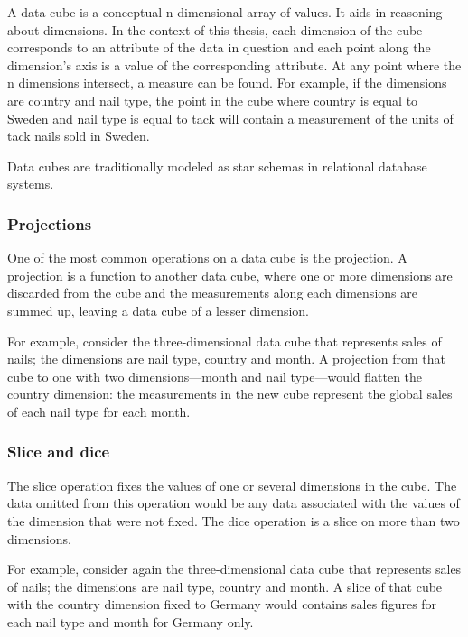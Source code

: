A data cube is a conceptual n-dimensional array of values. It aids in
reasoning about dimensions. In the context of this thesis, each dimension of
the cube corresponds to an attribute of the data in question and each point
along the dimension's axis is a value of the corresponding attribute. At any
point where the n dimensions intersect, a measure can be found. For example,
if the dimensions are country and nail type, the point in the cube where
country is equal to Sweden and nail type is equal to tack will contain a
measurement of the units of tack nails sold in Sweden.

Data cubes are traditionally modeled as star schemas in relational database
systems. \cite{olap_solutions}


\subsubsection*{Projections}

One of the most common operations on a data cube is the projection. A
projection is a function to another data cube, where one or more dimensions
are discarded from the cube and the measurements along each dimensions are
summed up, leaving a data cube of a lesser dimension.

For example, consider the three-dimensional data cube that represents sales of
nails; the dimensions are nail type, country and month. A projection from that
cube to one with two dimensions---month and nail type---would flatten the
country dimension: the measurements in the new cube represent the global sales
of each nail type for each month.


\subsubsection*{Slice and dice}


The slice operation fixes the values of one or several dimensions in the cube.
The data omitted from this operation would be any data associated with the
values of the dimension that were not fixed. The dice operation is a slice on
more than two dimensions.

For example, consider again the three-dimensional data cube that represents
sales of nails; the dimensions are nail type, country and month. A slice of
that cube with the country dimension fixed to Germany would contains sales
figures for each nail type and month for Germany only.


